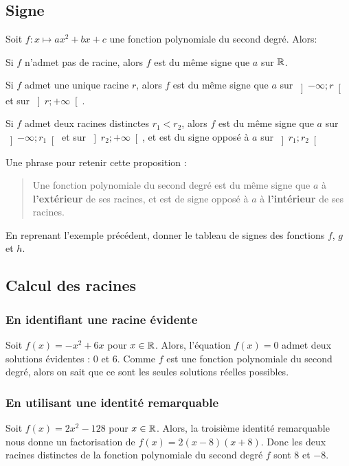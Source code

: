 \documentclass{poly}
\begin{document}
\subsection{Signe}
\begin{proposition}
Soit $f : x \mapsto ax^2 + bx + c$ une fonction polynomiale du second degré. Alors:
\begin{alphaquestions}
\item Si $f$ n'admet pas de racine, alors $f$ est du même signe que $a$ sur $\mathbb{R}$.
\item Si $f$ admet une unique racine $r$, alors $f$ est du même signe que $a$ sur $\left]-\infty;r\right[$ et sur $\left]r;+\infty\right[$.
\item Si $f$ admet deux racines distinctes $r_1 < r_2$, alors $f$ est du même signe que $a$ sur $\left]-\infty;r_1\right[$ et sur $\left]r_2;+\infty\right[$, et est du signe opposé à $a$ sur $\left]r_1;r_2\right[$
\end{alphaquestions}
\end{proposition}
\begin{remark}
Une phrase pour retenir cette proposition :
\begin{tcolorbox}
\begin{quote}
Une fonction polynomiale du second degré est du même signe que $a$ à \textbf{l'extérieur} de ses racines, et est de signe opposé à $a$ à \textbf{l'intérieur} de ses racines.
\end{quote}
\end{tcolorbox}
\end{remark}
\begin{example}
En reprenant l'exemple précédent, donner le tableau de signes des fonctions $f$, $g$ et $h$.
\end{example}
\subsection{Calcul des racines}
\subsubsection{En identifiant une racine évidente}
Soit $f(x) = -x^2 + 6x$ pour $x \in \mathbb{R}$. Alors, l'équation $f(x) = 0$ admet deux solutions évidentes : $0$ et $6$. Comme $f$ est une fonction polynomiale du second degré, alors on sait que ce sont les seules solutions réelles possibles.
\subsubsection{En utilisant une identité remarquable}
Soit $f(x)= 2x^2 - 128$ pour $x \in \mathbb{R}$. Alors, la troisième identité remarquable nous donne un factorisation de $f(x) = 2(x - 8)(x + 8)$. Donc les deux racines distinctes de la fonction polynomiale du second degré $f$ sont $8$ et $-8$.
\end{document}
